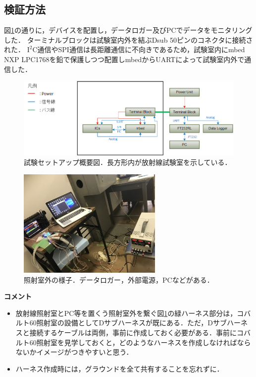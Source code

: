 \subsection{検証方法}
図\ref{fig4-1-0}の通りに，デバイスを配置し，データロガー及びPCでデータをモニタリングした．
ターミナルブロックは試験室内外を結ぶDsub 50ピンのコネクタに接続された．
$\textrm{I}^2 \textrm{C}$通信やSPI通信は長距離通信に不向きであるため，試験室内にmbed NXP LPC1768を鉛で保護しつつ配置しmbedからUARTによって試験室内外で通信した．

\begin{figure}[H]
	\centering
	\includegraphics[width=150mm]{04/fig/4-1-0.png}
	\caption{試験セットアップ概要図．長方形内が放射線試験室を示している．}
	\label{fig4-1-0}
\end{figure}
\begin{figure}[H]
	\centering
	\includegraphics[width=70mm]{04/fig/4-1-5.jpg}
	\caption{照射室外の様子．データロガー，外部電源，PCなどがある．}
	\label{fig4-1-5}
\end{figure}

\vspace{2ex} 
\textbf{コメント}
\begin{itemize}
	\item 放射線照射室とPC等を置くう照射室外を繋ぐ図\ref{fig4-1-0}の緑ハーネス部分は，コバルト60照射室の設備としてDサブハーネスが既にある．ただ，Dサブハーネスと接続するケーブルは両側，事前に作成しておく必要がある．事前にコバルト60照射室を見学しておくと，どのようなハーネスを作成しなければならないかイメージがつきやすいと思う．
	\item ハーネス作成時には，グラウンドを全て共有することを忘れずに．
\end{itemize}

